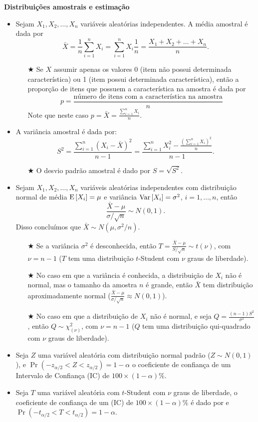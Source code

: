 \documentclass[10pt]{article}%
\def\Var{{\rm Var}\,}
\def\E{{\rm E}\,}
\begin{document}
\newpage
\textbf{Distribuições amostrais e estimação}

\begin{itemize}
\item Sejam $X_1, X_2, \ldots, X_n$ variáveis aleatórias independentes. A média amostral é dada por 
$$
\bar{X} = \frac{1}{n}\sum_{i=1}^n{X_i} = \sum_{i=1}^n{X_i\frac{1}{n}} = \frac{X_1 + X_2 + \ldots + X_n}{n}.
$$
\begin{itemize}
\item[$\bigstar$] Se $X$ assumir apenas os valores 0 (item não possui determinada característica) ou 1 (item possui determinada característica), então a proporção de itens que possuem a característica na amostra é dada por
$$
p = \frac{\mbox{número de itens com a característica na amostra}}{n}
$$
Note que neste caso $p = \bar{X} = \frac{\sum_{i=1}^n{X_i}}{n}$.
\end{itemize}
\item A variância amostral é dada por:
$$
S^2 = \frac{\sum_{i=1}^n{(X_i - \bar{X})^2}}{n - 1} = \frac{\sum_{i=1}^n{X_i^2} - \frac{\left(\sum_{i=1}^n{X_i}\right)^2}{n}}{n - 1}.
$$
\begin{itemize}
\item[$\bigstar$] O desvio padrão amostral é dado por $S = \sqrt{S^2}$.
\end{itemize}
\item Sejam $X_1, X_2, \ldots, X_n$ variáveis aleatórias independentes com distribuição normal de média $\E[X_i] = \mu$ e variância $\Var[X_i] = \sigma^2$, $i = 1, \ldots, n$, então
$$
\frac{\bar{X} - \mu}{\sigma/\sqrt{n}} \sim N(0,1).
$$
Disso concluímos que $\bar{X}\sim N(\mu,\sigma^2/n)$.
\begin{itemize}
\item[$\bigstar$] Se a variância $\sigma^2$ é desconhecida, então $T = \frac{\bar{X} - \mu}{S/\sqrt{n}} \sim t(\nu)$, com $\nu = n - 1$ ($T$ tem uma distribuição $t$-Student com $\nu$ graus de liberdade).
\item[$\bigstar$] No caso em que a variância é conhecida, a distribuição de $X_i$ não é normal, mas o tamanho da amostra $n$ é grande, então $\bar{X}$ tem distribuição aproximadamente normal ($\frac{\bar{X} - \mu}{\sigma/\sqrt{n}} \approx N(0,1)$).
\item[$\bigstar$] No caso em que a distribuição de $X_i$ não é normal, e seja $Q = \frac{(n-1)S^2}{\sigma^2}$, então $Q\sim \chi^2_{(\nu)}$, com $\nu = n - 1$ ($Q$ tem uma distribuição qui-quadrado com $\nu$ graus de liberdade).
\end{itemize}
\item Seja $Z$ uma variável aleatória com distribuição normal padrão ($Z\sim N(0,1)$), e $\Pr(-z_{\alpha/2} < Z < z_{\alpha/2}) = 1 - \alpha$ o coeficiente de confiança de um Intervalo de Confiança (IC) de $100\times (1-\alpha)\%$.
\item Seja $T$ uma variável aleatória com $t$-Student com $\nu$ graus de liberdade, o coeficiente de confiança de um (IC) de $100\times (1-\alpha)\%$ é dado por e $\Pr(-t_{\alpha/2} < T < t_{\alpha/2}) = 1 - \alpha$.
\end{itemize}
\end{document}
